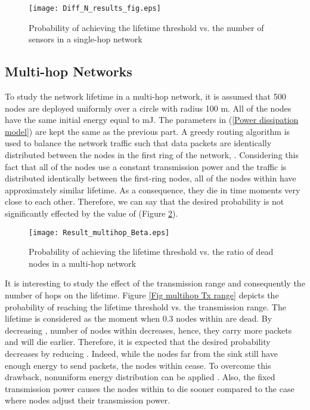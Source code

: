 \documentclass[conference]{IEEEtran}
\begin{document}
\begin{figure}[!h]
\centering
\texttt{[image: Diff\_N\_results\_fig.eps]}
\caption{Probability of achieving the lifetime threshold vs. the
number of sensors in a single-hop network} \label{Fig Node density
effect}
\end{figure}

\subsection{Multi-hop Networks}
To study the network lifetime in a multi-hop network, it is assumed
that 500 nodes are deployed uniformly over a circle with radius 100 m. All of the nodes have the same initial energy
equal to  mJ. The parameters in (\ref{Power dissipation
model}) are kept the same as the previous part. A greedy routing
algorithm is used to balance the network traffic such that data
packets are identically distributed between the nodes in the first
ring of the network, . Considering this fact that all of
the nodes use a constant transmission power and the traffic is
distributed identically between the first-ring nodes, all of the
nodes within  have approximately similar lifetime. As a
consequence, they die in time moments very close to each other.
Therefore, we can say that the desired probability is not
significantly effected by the value of  (Figure \ref{Fig Beta
Multihop}).

\begin{figure}[!h]
\centering
\texttt{[image: Result\_multihop\_Beta.eps]}
\caption{Probability of achieving the lifetime threshold vs. the
ratio of dead nodes in a multi-hop network} \label{Fig Beta
Multihop}
\end{figure}

It is interesting to study the effect of the transmission range and
consequently the number of hops on the lifetime. Figure \ref{Fig
multihop Tx range} depicts the probability of reaching the lifetime
threshold vs. the transmission range. The lifetime is considered as
the moment when 0.3 nodes within  are dead. By
decreasing , number of nodes within  decreases, hence,
they carry more packets and will die earlier. Therefore, it is
expected that the desired probability decreases by reducing .
Indeed, while the nodes far from the sink still have enough energy
to send packets, the nodes within  cease. To overcome this
drawback, nonuniform energy distribution can be applied
\cite{IEEE_Monograph}. Also, the fixed transmission power causes the
nodes within  to die sooner compared to the case where nodes adjust their transmission power.
\end{document}
